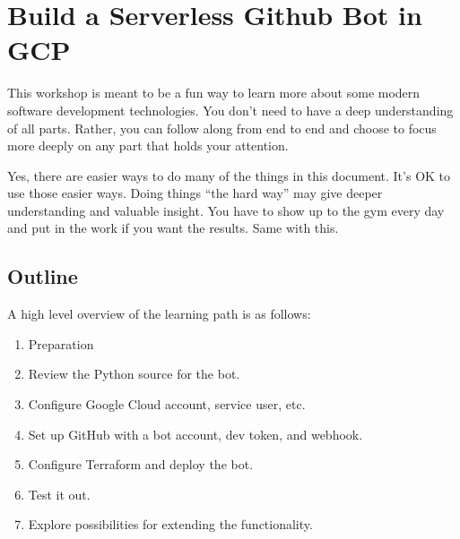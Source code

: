 







\section{\label{sec:Start}Build a Serverless Github Bot in GCP}
\vspace{2mm}

\justifying
This workshop is meant to be a fun way to learn more about some modern software development technologies.
You don't need to have a deep understanding of all parts. Rather, you can follow along from end to end
and choose to focus more deeply on any part that holds your attention.

\justifying
Yes, there are easier ways to do many of the things in this document. It's OK to use those easier ways.
Doing things ``the hard way'' may give deeper understanding and valuable insight. You have to show
up to the gym every day and put in the work if you want the results. Same with this.

\subsection{\label{sec:outline}Outline}

\justifying
A high level overview of the learning path is as follows:

\begin{raggedright}
	\begin{enumerate}
		\item Preparation
		\item Review the Python source for the bot.
		\item Configure Google Cloud account, service user, etc.
		\item Set up GitHub with a bot account, dev token, and webhook.
		\item Configure Terraform and deploy the bot.
		\item Test it out.
		\item Explore possibilities for extending the functionality.
	\end{enumerate}
\end{raggedright}
\vspace{2mm}

